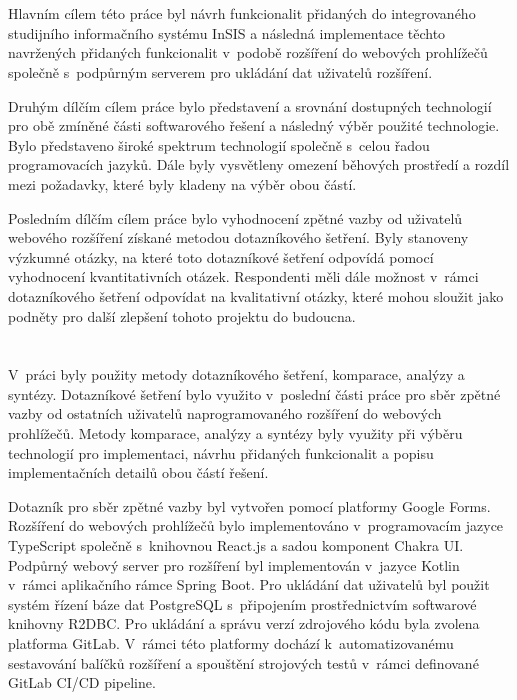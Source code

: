 \section*{\CilPrace}

Hlavním cílem této práce byl návrh funkcionalit přidaných do integrovaného studijního informačního systému InSIS a následná implementace těchto navržených přidaných funkcionalit v~podobě rozšíření do webových prohlížečů společně s~podpůrným serverem pro ukládání dat uživatelů rozšíření. 

Druhým dílčím cílem práce bylo představení a srovnání dostupných technologií pro obě zmíněné části softwarového řešení a následný výběr použité technologie. Bylo představeno široké spektrum technologií společně s~celou řadou programovacích jazyků. Dále byly vysvětleny omezení běhových prostředí a rozdíl mezi požadavky, které byly kladeny na výběr obou částí.  

Posledním dílčím cílem práce bylo vyhodnocení zpětné vazby od uživatelů webového rozšíření získané metodou dotazníkového šetření. Byly stanoveny výzkumné otázky, na které toto dotazníkové šetření odpovídá pomocí vyhodnocení kvantitativních otázek. Respondenti měli dále možnost v~rámci dotazníkového šetření odpovídat na kvalitativní otázky, které mohou sloužit jako podněty pro další zlepšení tohoto projektu do budoucna. 

\section*{\PouziteMetody}

V~práci byly použity metody dotazníkového šetření, komparace, analýzy a syntézy. Dotazníkové šetření bylo využito v~poslední části práce pro sběr zpětné vazby od ostatních uživatelů naprogramovaného rozšíření do webových prohlížečů. Metody komparace, analýzy a syntézy byly využity při výběru technologií pro implementaci, návrhu přidaných funkcionalit a popisu implementačních detailů obou částí řešení.    

Dotazník pro sběr zpětné vazby byl vytvořen pomocí platformy Google Forms. Rozšíření do webových prohlížečů bylo implementováno v~programovacím jazyce TypeScript společně s~knihovnou React.js a sadou komponent Chakra UI. Podpůrný webový server pro rozšíření byl implementován v~jazyce Kotlin v~rámci aplikačního rámce Spring Boot. Pro ukládání dat uživatelů byl použit systém řízení báze dat PostgreSQL s~připojením prostřednictvím softwarové knihovny R2DBC. Pro ukládání a správu verzí zdrojového kódu byla zvolena platforma GitLab. V~rámci této platformy dochází k~automatizovanému sestavování balíčků rozšíření a spouštění strojových testů v~rámci definované GitLab CI/CD pipeline.

